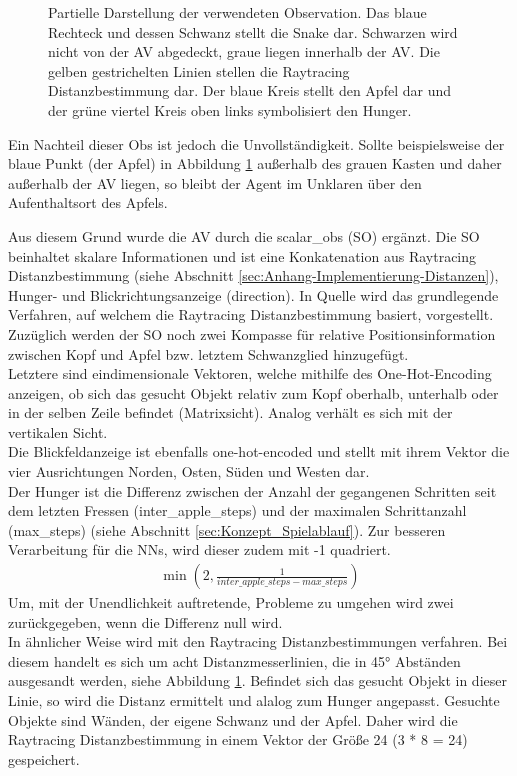 \begin{figure}[H]
	\centering
	\def\svgscale{0.8}
	
	\caption[Observation]{Partielle Darstellung der verwendeten Observation. Das blaue Rechteck und dessen Schwanz stellt die Snake dar. Schwarzen  wird nicht von der AV abgedeckt, graue liegen innerhalb der AV. Die gelben gestrichelten Linien stellen die Raytracing Distanzbestimmung dar. Der blaue Kreis stellt den Apfel dar und der grüne viertel Kreis oben links symbolisiert den Hunger.}
	\label{fig:Observation}
\end{figure}
Ein Nachteil dieser Obs ist jedoch die Unvollständigkeit. Sollte beispielsweise der blaue Punkt (der Apfel) in Abbildung \ref{fig:Observation} außerhalb des grauen Kasten und daher außerhalb der AV liegen, so bleibt der Agent im Unklaren über den Aufenthaltsort des Apfels.

Aus diesem Grund wurde die AV durch die scalar\_obs (SO) ergänzt.
Die SO beinhaltet skalare Informationen und ist eine Konkatenation aus Raytracing Distanzbestimmung (siehe Abschnitt \ref{sec:Anhang-Implementierung-Distanzen}), Hunger- und Blickrichtungsanzeige (direction). In Quelle \cite{Glassner1989} wird das grundlegende Verfahren, auf welchem die Raytracing Distanzbestimmung basiert, vorgestellt. 
Zuzüglich werden der SO noch zwei Kompasse für relative Positionsinformation zwischen Kopf und Apfel bzw. letztem Schwanzglied hinzugefügt.\\
Letztere sind eindimensionale Vektoren, welche mithilfe des One-Hot-Encoding anzeigen, ob sich das gesucht Objekt relativ zum Kopf oberhalb, unterhalb oder in der selben Zeile befindet (Matrixsicht). Analog verhält es sich mit der vertikalen Sicht.\\
Die Blickfeldanzeige ist ebenfalls one-hot-encoded und stellt mit ihrem Vektor die vier Ausrichtungen Norden, Osten, Süden und Westen dar.\\
Der Hunger ist die Differenz zwischen der Anzahl der gegangenen Schritten seit dem letzten Fressen (inter\_apple\_steps) und der maximalen Schrittanzahl (max\_steps) (siehe Abschnitt \ref{sec:Konzept_Spielablauf}). Zur besseren Verarbeitung für die NNs, wird dieser zudem mit -1 quadriert.
\begin{align}
	\min(2, \frac{1}{inter\_apple\_steps - max\_steps})
\end{align}
Um, mit der Unendlichkeit auftretende, Probleme zu umgehen wird zwei zurückgegeben, wenn die Differenz null wird.\\
In ähnlicher Weise wird mit den Raytracing Distanzbestimmungen verfahren. Bei diesem handelt es sich um acht Distanzmesserlinien, die in 45° Abständen ausgesandt werden, siehe Abbildung \ref{fig:Observation}. Befindet sich das gesucht Objekt in dieser Linie, so wird die Distanz ermittelt und alalog zum Hunger angepasst. Gesuchte Objekte sind Wänden, der eigene Schwanz und der Apfel. Daher wird die Raytracing Distanzbestimmung in einem Vektor der Größe 24 (3 * 8 = 24) gespeichert.

